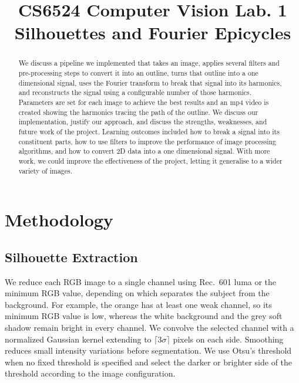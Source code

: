 \documentclass[conference]{IEEEtran}
\begin{document}
\title{CS6524 Computer Vision Lab. 1\\ Silhouettes and Fourier Epicycles}

\author{
\and
{}
\and
{}
}

\maketitle

\begin{abstract}
We discuss a pipeline we implemented that takes an image, applies several filters and pre-processing steps to convert it into an outline, turns that outline into a one dimensional signal, uses the Fourier transform to break that signal into its harmonics, and reconstructs the signal using a configurable number of those harmonics. Parameters are set for each image to achieve the best results and an mp4 video is created showing the harmonics tracing the path of the outline. We discuss our implementation, justify our approach, and discuss the strengths, weaknesses, and future work of the project. Learning outcomes included how to break a signal into its constituent parts, how to use filters to improve the performance of image processing algorithms, and how to convert 2D data into a one dimensional signal. With more work, we could improve the effectiveness of the project, letting it generalise to a wider variety of images.
\end{abstract}




\section{Methodology}\label{sec:methodology}

\subsection{Silhouette Extraction}
We reduce each RGB image to a single channel using Rec.~601 luma or the minimum RGB value, depending on which separates
the subject from the background. For example, the orange has at least one
weak channel, so its minimum RGB value is low, whereas the white background
and the grey soft shadow remain bright in every channel. We
convolve the selected channel with a normalized Gaussian kernel extending
to $\lceil 3\sigma\rceil$ pixels on each side. Smoothing reduces small
intensity variations before segmentation. We use Otsu's threshold when no
fixed threshold is specified and select the darker or brighter side of
the threshold according to the image configuration.
\end{document}
